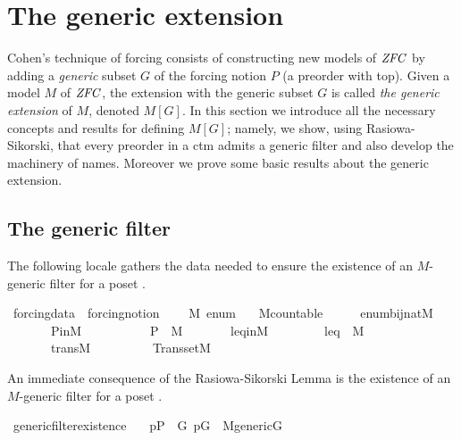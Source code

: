 \section{The generic extension}

Cohen's technique of forcing consists of constructing new models of
$\mathit{ZFC}$ by adding a \emph{generic} subset $G$ of the forcing notion $P$
(a preorder with top). Given a model $M$ of $\mathit{ZFC}$, the extension with
the generic subset $G$ is called \emph{the generic extension} of $M$,
denoted $M[G]$.  In this section we introduce all the necessary
concepts and results for defining $M[G]$; namely, we show, using
Rasiowa-Sikorski, that every preorder in a ctm admits a generic filter
and also develop the machinery of names. Moreover we prove some basic
results about the generic extension.

\subsection{The generic filter}
\label{sec:generic-filter}
The following locale gathers the data needed to ensure the 
existence of an $M$-generic filter for a poset . 

\begin{isabelle}
\isamarkupfalse%
\ forcing{\isacharunderscore}data\ {\isacharequal}\ forcing{\isacharunderscore}notion\ {\isacharplus}\isanewline
\ \ \ M\ enum\isanewline
\ \ \ M{\isacharunderscore}countable{\isacharcolon}\ \ \ \ \ \ {\isachardoublequoteopen}enum{\isasymin}bij{\isacharparenleft}nat{\isacharcomma}M{\isacharparenright}{\isachardoublequoteclose}\isanewline
\ \ \ \ \ \ \ P{\isacharunderscore}in{\isacharunderscore}M{\isacharcolon}\ \ \ \ \ \ \ \ \ \ \ {\isachardoublequoteopen}P\ {\isasymin}\ M{\isachardoublequoteclose}\isanewline
\ \ \ \ \ \ \ leq{\isacharunderscore}in{\isacharunderscore}M{\isacharcolon}\ \ \ \ \ \ \ \ \ {\isachardoublequoteopen}leq\ {\isasymin}\ M{\isachardoublequoteclose}\isanewline
\ \ \ \ \ \ \ trans{\isacharunderscore}M{\isacharcolon}\ \ \ \ \ \ \ \ \ \ {\isachardoublequoteopen}Transset{\isacharparenleft}M{\isacharparenright}{\isachardoublequoteclose}
\end{isabelle}

An immediate consequence of the Rasiowa-Sikorski Lemma is the
existence of an $M$-generic filter for a poset .

\begin{isabelle}

\isamarkupfalse%
\ generic{\isacharunderscore}filter{\isacharunderscore}existence{\isacharcolon}\ \isanewline
\ \ {\isachardoublequoteopen}p{\isasymin}P\ {\isasymLongrightarrow}\ {\isasymexists}G{\isachardot}\ p{\isasymin}G\ {\isasymand}\ M{\isacharunderscore}generic{\isacharparenleft}G{\isacharparenright}{\isachardoublequoteclose}
\end{isabelle}

